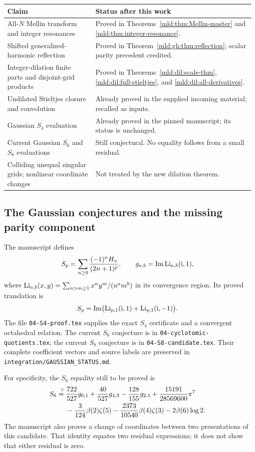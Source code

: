 \begin{center}
\begin{tabularx}{\textwidth}{@{}>{\raggedright\arraybackslash}p{}Y@{}}
\toprule
Claim & Status after this work\\
\midrule
All-$N$ Mellin transform and integer resonances & Proved in
Theorems~\ref{mld:thm:Mellin-master} and \ref{mld:thm:integer-resonance}.\\
Shifted generalized-harmonic reflection & Proved in
Theorem~\ref{mld:gh:thm:reflection}; scalar parity precedent credited.\\
Integer-dilation finite parts and disjoint-grid products & Proved in
Theorems~\ref{mld:dil:scale-thm}, \ref{mld:dil:full-stieltjes}, and
\ref{mld:dil:all-derivatives}.\\
Undilated Stieltjes closure and convolution & Already proved in the
supplied incoming material; recalled as inputs.\\
Gaussian $S_4$ evaluation & Already proved in the pinned manuscript;
its status is unchanged.\\
Current Gaussian $S_6$ and $S_8$ evaluations & Still conjectural.
No equality follows from a small residual.\\
Colliding unequal singular grids; nonlinear coordinate changes &
Not treated by the new dilation theorem.\\
\bottomrule
\end{tabularx}
\end{center}

\subsection{The Gaussian conjectures and the missing parity component}

The manuscript defines
\[
 S_p=\sum_{n\ge0}\frac{(-1)^nH_n}{(2n+1)^p},\qquad
 g_{a,b}=\operatorname{Im}\operatorname{Li}_{a,b}(\mathrm{i},1),
\]
where
$\operatorname{Li}_{a,b}(x,y)=\sum_{n>m\ge1}x^ny^m/(n^am^b)$ in its convergence
region. Its proved translation is
\[
 S_p=\operatorname{Im}\bigl(\operatorname{Li}_{p,1}(\mathrm{i},1)
                                  +\operatorname{Li}_{p,1}(\mathrm{i},-1)\bigr).
\]
The file \texttt{04-S4-proof.tex} supplies the exact $S_4$ certificate
and a convergent octahedral relation. The current $S_6$ conjecture is in
\texttt{04-cyclotomic-quotients.tex}; the current $S_8$ conjecture is in
\texttt{04-S8-candidate.tex}. Their complete coefficient vectors and
source labels are preserved in \texttt{integration/GAUSSIAN\_STATUS.md}.

For specificity, the $S_6$ equality still to be proved is
\begin{align}
 S_6\stackrel{?}{={}}&\frac{722}{527}g_{6,1}
  +\frac{40}{527}g_{4,3}-\frac{128}{155}g_{2,5}
  +\frac{15191}{28569600}\pi^7\notag\\
 &-\frac3{124}\beta(2)\zeta(5)
  -\frac{2373}{10540}\beta(4)\zeta(3)-2\beta(6)\log2.
 \label{mld:eq:S6-open}
\end{align}
The manuscript also proves a change of coordinates between two
presentations of this candidate. That identity equates two residual
expressions; it does not show that either residual is zero.


